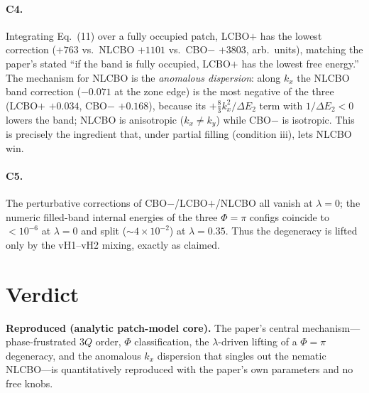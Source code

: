 \documentclass[11pt]{article}
\begin{document}
\paragraph{C4.} Integrating Eq.~(11) over a fully occupied patch, LCBO$+$ has the
lowest correction ($+763$ vs.\ NLCBO $+1101$ vs.\ CBO$-$ $+3803$, arb.\ units),
matching the paper's stated ``if the band is fully occupied, LCBO$+$ has the lowest
free energy.'' The mechanism for NLCBO is the \emph{anomalous dispersion}: along
$k_x$ the NLCBO band correction ($-0.071$ at the zone edge) is the most negative of
the three (LCBO$+$ $+0.034$, CBO$-$ $+0.168$), because its $+\tfrac{8}{3}k_x^2/
\Delta E_2$ term with $1/\Delta E_2<0$ lowers the band; NLCBO is anisotropic
($k_x\neq k_y$) while CBO$-$ is isotropic. This is precisely the ingredient that,
under partial filling (condition iii), lets NLCBO win.

\paragraph{C5.} The perturbative corrections of CBO$-$/LCBO$+$/NLCBO all vanish at
$\lambda=0$; the numeric filled-band internal energies of the three $\Phi=\pi$
configs coincide to $<10^{-6}$ at $\lambda=0$ and split ($\sim4\times10^{-2}$) at
$\lambda=0.35$. Thus the degeneracy is lifted only by the vH1--vH2 mixing, exactly
as claimed.

\section{Verdict}
\textbf{Reproduced (analytic patch-model core).} The paper's central mechanism---
phase-frustrated $3Q$ order, $\Phi$ classification, the $\lambda$-driven lifting of
a $\Phi=\pi$ degeneracy, and the anomalous $k_x$ dispersion that singles out the
nematic NLCBO---is quantitatively reproduced with the paper's own parameters and no
free knobs.
\begin{center}
\end{center}
\end{document}
